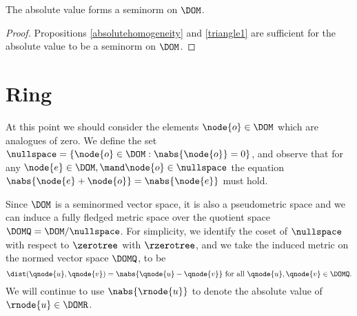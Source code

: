\begin{corollary}\label{gseminorm}
  The absolute value forms a seminorm on $\DOM$.
  \begin{proof}  
    Propositions \ref{absolutehomogeneity} and \ref{triangle1} are 
    sufficient for the absolute value to be a seminorm on
    $\DOM$.
  \end{proof}
\end{corollary}

\section{Ring}\label{Ring}

At this point we should consider the elements $\node{o}\in\DOM$
which are analogues of zero. We define the set $\nullspace =
\{\node{o}\in\DOM : \nabs{\node{o}} = 0\}$, and observe that for any
$\node{e} \in \DOM, \mand \node{o} \in \nullspace$ the equation
$\nabs{\node{e} + \node{o}} = \nabs{\node{e}}$ must hold. 

Since $\DOM$ is a seminormed vector space, it is also a pseudometric
space and we can induce a fully fledged metric space over the quotient
space $\DOMQ = \DOM / \nullspace$.
For simplicity, we identify the coset of $\nullspace$ with respect to
$\zerotree$ with $\rzerotree$, and we take the induced metric on the
normed vector space $\DOMQ$, to be \[\dist(\qnode{u},\qnode{v}) =
\nabs{\qnode{u} - \qnode{v}} \text{ for all }\qnode{u}, \qnode{v} \in
\DOMQ.\]  We will continue to use $\nabs{\rnode{u}}$ to denote the absolute
value of $\rnode{u}\in\DOMR$.

